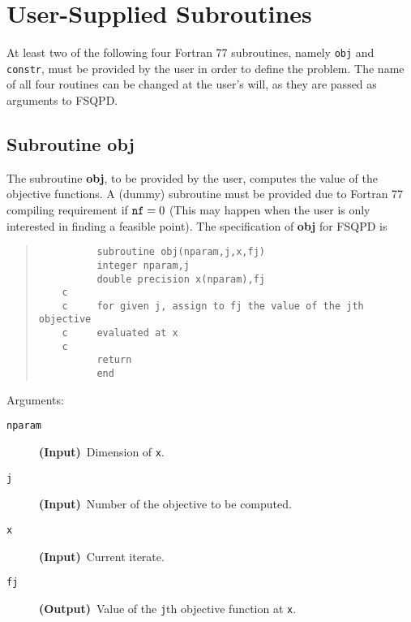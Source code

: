 \section{User-Supplied Subroutines}
At least two of the following four Fortran 77 subroutines, 
namely {\tt obj} and {\tt constr}, 
must be provided by the user in order to define the problem. 
The name of all four routines can be changed at the user's will, 
as they are passed as arguments to FSQPD.

\subsection{Subroutine obj}
The subroutine {\bf obj}, to be provided by the user, 
computes the value of the objective functions. 
A (dummy) subroutine must be provided due to Fortran 77 compiling
requirement if $\mbox{\tt nf}=0$ (This may happen when the user
is only interested in finding a feasible point).
The specification of {\bf obj} for FSQPD is
\begin{quote}
\begin{verbatim}
          subroutine obj(nparam,j,x,fj)
          integer nparam,j
          double precision x(nparam),fj
    c     
    c     for given j, assign to fj the value of the jth objective
    c     evaluated at x 
    c
          return
          end
\end{verbatim}
\end{quote}
\noindent Arguments:
\begin{description}
\item[\tt nparam] {\bf (Input)}~Dimension of {\tt x}.
\item[\tt j]      {\bf (Input)}~Number of the objective to be computed.
\item[\tt x]      {\bf (Input)}~Current iterate.
\item[\tt fj]     {\bf (Output)}~Value of the {\tt j}th objective function
                  at {\tt x}.
\end{description}

